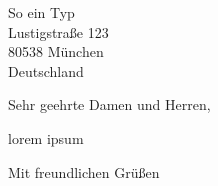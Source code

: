 \documentclass
[
    fontsize=12pt, %
    version=last,  %
    parskip=full   %
]
{scrlttr2}
\begin{document}


\begin{letter}{%
    So ein Typ\\
    Lustigstraße 123\\
    80538 München\\
    Deutschland
}


\opening{Sehr geehrte Damen und Herren,}

lorem ipsum


\closing{Mit freundlichen Grüßen}




\end{letter}
\end{document}
